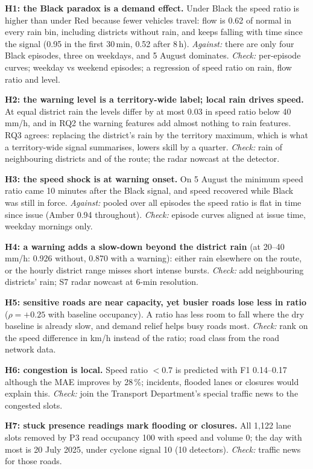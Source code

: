 \documentclass[conference]{IEEEtran}
\begin{document}
\textbf{H1: the Black paradox is a demand effect.} Under Black the speed ratio is higher than
under Red because fewer vehicles travel: flow is 0.62 of normal in every rain bin, including
districts without rain, and keeps falling with time since the signal (0.95 in the first
30\,min, 0.52 after 8\,h). \emph{Against:} there are only four Black episodes, three on
weekdays, and 5 August dominates. \emph{Check:} per-episode curves; weekday vs weekend
episodes; a regression of speed ratio on rain, flow ratio and level.

\textbf{H2: the warning level is a territory-wide label; local rain drives speed.} At equal
district rain the levels differ by at most 0.03 in speed ratio below 40\,mm/h, and in RQ2 the
warning features add almost nothing to rain features. RQ3 agrees: replacing the district's
rain by the territory maximum, which is what a territory-wide signal summarises, lowers skill
by a quarter. \emph{Check:} rain of neighbouring districts and of the route; the radar nowcast
at the detector.

\textbf{H3: the speed shock is at warning onset.} On 5 August the minimum speed ratio came 10
minutes after the Black signal, and speed recovered while Black was still in force.
\emph{Against:} pooled over all episodes the speed ratio is flat in time since issue (Amber
0.94 throughout). \emph{Check:} episode curves aligned at issue time, weekday mornings only.

\textbf{H4: a warning adds a slow-down beyond the district rain} (at 20--40\,mm/h: 0.926
without, 0.870 with a warning): either rain elsewhere on the route, or the hourly district
range misses short intense bursts. \emph{Check:} add neighbouring districts' rain; S7 radar
nowcast at 6-min resolution.

\textbf{H5: sensitive roads are near capacity, yet busier roads lose less in ratio}
($\rho=+0.25$ with baseline occupancy). A ratio has less room to fall where the dry baseline
is already slow, and demand relief helps busy roads most. \emph{Check:} rank on the speed
difference in km/h instead of the ratio; road class from the road network data.

\textbf{H6: congestion is local.} Speed ratio $<0.7$ is predicted with F1 0.14--0.17 although
the MAE improves by 28\,\%; incidents, flooded lanes or closures would explain this.
\emph{Check:} join the Transport Department's special traffic news to the congested slots.

\textbf{H7: stuck presence readings mark flooding or closures.} All 1,122 lane slots removed
by P3 read occupancy 100 with speed and volume 0; the day with most is 20 July 2025, under
cyclone signal 10 (10 detectors). \emph{Check:} traffic news for those roads.
\end{document}
